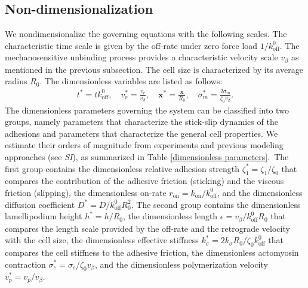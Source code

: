 \documentclass[12pt]{article}
\newcommand{\mbf}{\boldsymbol}
\begin{document}
        \subsection*{Non-dimensionalization}
        We nondimensionalize the governing equations with the following scales. 
        The characteristic time scale is given by the off-rate under zero force load $1/k_{\text{off}}^0$. The mechanosensitive unbinding process provides a characteristic velocity scale $v_\beta$ as mentioned in the previous subsection. 
        The cell size is characterized by its average radius $R_0$. 
        The dimensionless variables are listed as follows:
        \begin{align}
            t^\ast = t k_{\text{off}}^0, \quad v_r^\ast = \frac{v_r}{v_\beta},\quad \mbf{x}^\ast = \frac{\mbf{x}}{R_0},\quad \sigma_m^\ast = \frac{2\sigma_m}{\zeta_0 v_\beta}. 
        \end{align}
        The dimensionless parameters governing the system can be classified into two groups, namely parameters that characterize the stick-slip dynamics of the adhesions and parameters that characterize the general cell properties. 
        We estimate their orders of magnitude from experiments and previous modeling approaches (see \textit{SI}), as summarized in Table \ref{dimensionless parameters}.\ 
        The first group contains the dimensionless relative adhesion strength $\zeta_1^\ast = {\zeta_1}/{\zeta_0}$ that compares the contribution of the adhesive friction (sticking) and the viscous friction (slipping), the dimensionless on-rate $r_{\text{on}} = k_{\text{on}}/k_{\text{off}}^0$, and the dimensionless diffusion coefficient $D^\ast = D /k_{\text{off}}^0 R_0^2$. 
        The second group contains the dimensionless lamellipodium height $h^\ast = h/R_0$, the dimensionless length $\epsilon = v_\beta/k_{\text{off}}^0 R_0$ that compares the length scale provided by the off-rate and the retrograde velocity with the cell size, the dimensionless effective stiffness $k_\sigma^\ast = 2k_\sigma R_0/\zeta_0 k_{\text{off}}^0$ that compares the cell stiffness to the adhesive friction, the dimensionless actomyosin contraction $\sigma_c^\ast = \sigma_c / \zeta_0 v_\beta$, and the dimensionless polymerization velocity $v_p^\ast = v_p/v_\beta$. 
      
\end{document}
